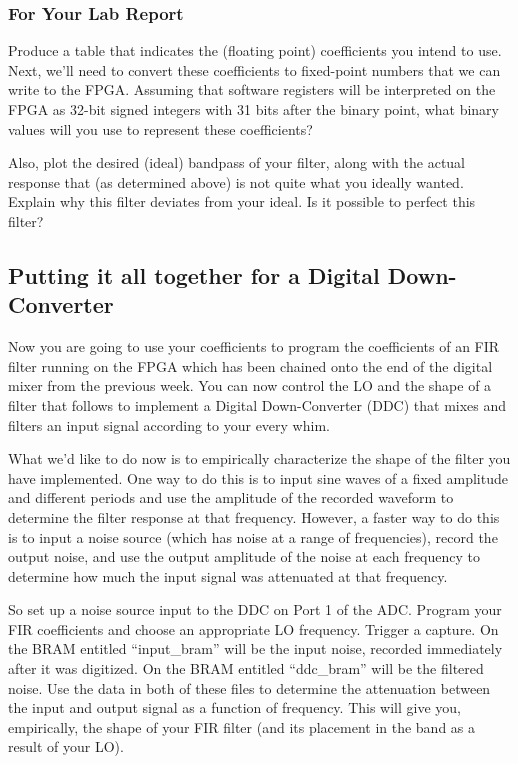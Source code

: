 \documentclass[11pt]{article}
\begin{document}
\subsubsection{For Your Lab Report}

Produce a table that indicates the (floating point) coefficients you intend to
use.  Next, we'll need to convert these coefficients to fixed-point numbers
that we can write to the FPGA.  Assuming that software registers will be
interpreted on the FPGA as 32-bit signed integers with 31 bits after the binary
point, what binary values will you use to represent these coefficients?

Also, plot the desired (ideal) bandpass of your filter, along with the actual
response that (as determined above) is not quite what you ideally wanted.
Explain why this filter deviates from your ideal.  Is it possible to perfect
this filter?

\subsection{Putting it all together for a Digital Down-Converter} \label{ddc}

Now you are going to use your coefficients to program the coefficients of an FIR filter running on the
FPGA which has been chained onto the end of the digital mixer from the previous week.  You can now control
the LO and the shape of a filter that follows to implement a Digital Down-Converter (DDC) that mixes and filters
an input signal according to your every whim.

What we'd like to do now is to empirically characterize the shape of the filter you have implemented.  One way to
do this is to input sine waves of a fixed amplitude and different periods and use the amplitude of the recorded
waveform to determine the filter response at that frequency.  However, a faster way to do this is to input a noise
source (which has noise at a range of frequencies), record the output noise, and use the output amplitude of the noise
at each frequency to determine how much the input signal was attenuated at that frequency.

So set up a noise source input to the DDC on Port 1 of the ADC.  Program your FIR coefficients and choose an appropriate
LO frequency.  Trigger a capture.  On the BRAM entitled ``input\_bram'' will be the input noise, recorded immediately after
it was digitized.  On the BRAM entitled ``ddc\_bram'' will be the filtered noise.  Use the data in
both of these files to determine the attenuation between the input and output signal as a function of frequency.  This will
give you, empirically, the shape of your FIR filter (and its placement in the band as a result of your LO).
\end{document}

